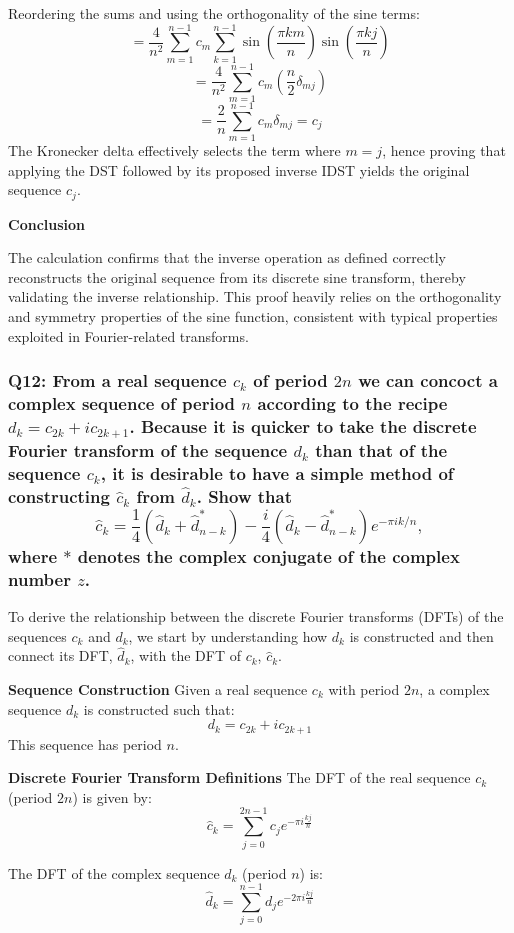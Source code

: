 \documentclass[8pt]{article}
\begin{document}
Reordering the sums and using the orthogonality of the sine terms:
\[
= \frac{4}{n^2} \sum_{m=1}^{n-1} c_m \sum_{k=1}^{n-1} \sin \left( \frac{\pi km}{n} \right) \sin \left( \frac{\pi kj}{n} \right)
\]
\[
= \frac{4}{n^2} \sum_{m=1}^{n-1} c_m \left( \frac{n}{2} \delta_{mj} \right)
\]
\[
= \frac{2}{n} \sum_{m=1}^{n-1} c_m \delta_{mj} = c_j
\]
The Kronecker delta effectively selects the term where \( m = j \), hence proving that applying the DST followed by its proposed inverse IDST yields the original sequence \( c_j \).

\textbf{Conclusion}

The calculation confirms that the inverse operation as defined correctly reconstructs the original sequence from its discrete sine transform, thereby validating the inverse relationship. This proof heavily relies on the orthogonality and symmetry properties of the sine function, consistent with typical properties exploited in Fourier-related transforms.

\subsubsection*{Q12:
From a real sequence \(c_k\) of period \(2n\) we can concoct a complex sequence of period \(n\) according to the recipe \(d_k = c_{2k} + i c_{2k+1}\). Because it is quicker to take the discrete Fourier transform of the sequence \(d_k\) than that of the sequence \(c_k\), it is desirable to have a simple method of constructing \(\hat{c}_k\) from \(\hat{d}_k\). Show that
\[
\hat{c}_k = \frac{1}{4} \left( \hat{d}_k + \hat{d}^*_{n-k} \right) - \frac{i}{4} \left( \hat{d}_k - \hat{d}^*_{n-k} \right) e^{-\pi i k / n},
\]
where \(*\) denotes the complex conjugate of the complex number \(z\).}

To derive the relationship between the discrete Fourier transforms (DFTs) of the sequences \(c_k\) and \(d_k\), we start by understanding how \(d_k\) is constructed and then connect its DFT, \(\hat{d}_k\), with the DFT of \(c_k\), \(\hat{c}_k\).

\textbf{Sequence Construction}
Given a real sequence \(c_k\) with period \(2n\), a complex sequence \(d_k\) is constructed such that:
\[
d_k = c_{2k} + i c_{2k+1}
\]
This sequence has period \(n\).

\textbf{Discrete Fourier Transform Definitions}
The DFT of the real sequence \(c_k\) (period \(2n\)) is given by:
\[
\hat{c}_k = \sum_{j=0}^{2n-1} c_j e^{-\pi i \frac{kj}{n}}
\]

The DFT of the complex sequence \(d_k\) (period \(n\)) is:
\[
\hat{d}_k = \sum_{j=0}^{n-1} d_j e^{-2\pi i \frac{kj}{n}}
\]
\end{document}
